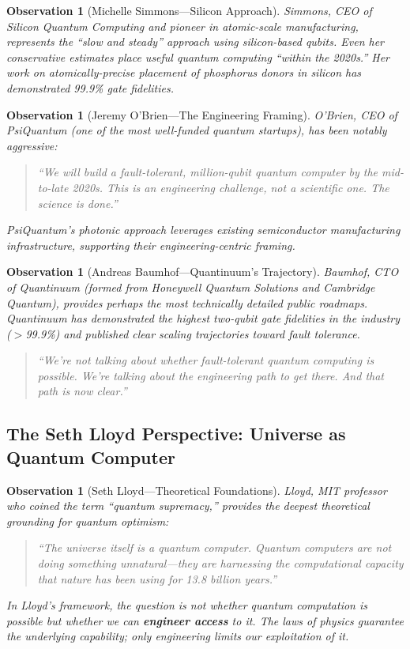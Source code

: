 \documentclass[11pt,a4paper]{article}
\newtheorem{observation}[theorem]{Observation}
\begin{document}
\begin{observation}[Michelle Simmons---Silicon Approach]
Simmons, CEO of Silicon Quantum Computing and pioneer in atomic-scale manufacturing, represents the ``slow and steady'' approach using silicon-based qubits. Even her conservative estimates place useful quantum computing ``within the 2020s.'' Her work on atomically-precise placement of phosphorus donors in silicon has demonstrated 99.9\% gate fidelities.
\end{observation}

\begin{observation}[Jeremy O'Brien---The Engineering Framing]
O'Brien, CEO of PsiQuantum (one of the most well-funded quantum startups), has been notably aggressive:
\begin{quote}
\textit{``We will build a fault-tolerant, million-qubit quantum computer by the mid-to-late 2020s. This is an engineering challenge, not a scientific one. The science is done.''}
\end{quote}
PsiQuantum's photonic approach leverages existing semiconductor manufacturing infrastructure, supporting their engineering-centric framing.
\end{observation}

\begin{observation}[Andreas Baumhof---Quantinuum's Trajectory]
Baumhof, CTO of Quantinuum (formed from Honeywell Quantum Solutions and Cambridge Quantum), provides perhaps the most technically detailed public roadmaps. Quantinuum has demonstrated the highest two-qubit gate fidelities in the industry ($>$99.9\%) and published clear scaling trajectories toward fault tolerance.

\begin{quote}
\textit{``We're not talking about whether fault-tolerant quantum computing is possible. We're talking about the engineering path to get there. And that path is now clear.''}
\end{quote}
\end{observation}

\subsection{The Seth Lloyd Perspective: Universe as Quantum Computer}

\begin{observation}[Seth Lloyd---Theoretical Foundations]
Lloyd, MIT professor who coined the term ``quantum supremacy,'' provides the deepest theoretical grounding for quantum optimism:
\begin{quote}
\textit{``The universe itself is a quantum computer. Quantum computers are not doing something unnatural---they are harnessing the computational capacity that nature has been using for 13.8 billion years.''}
\end{quote}
In Lloyd's framework, the question is not whether quantum computation is possible but whether we can \textbf{engineer access} to it. The laws of physics guarantee the underlying capability; only engineering limits our exploitation of it.
\end{observation}
\end{document}
